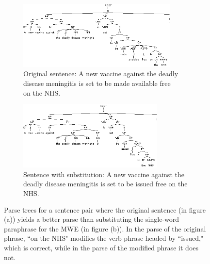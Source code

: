 \documentclass[11pt]{article}
\begin{document}
\begin{figure}
\centering
\begin{subfigure}{.5\textwidth}
  \centering
  \includegraphics[width=80mm]{figs/made_available_tree.png}
  \caption{Original sentence: A new vaccine against the deadly \\
disease meningitis is set to be made available free \\
on the NHS.}
  \label{fig:sub1}
\end{subfigure}%
\begin{subfigure}{.5\textwidth}
  \centering
  \includegraphics[width=73mm]{figs/issued_tree.png}
  \caption{Sentence with substitution: A new vaccine against the deadly disease meningitis is set to be issued free on the NHS.}
  \label{fig:sub2}
\end{subfigure}
\caption{Parse trees for a sentence pair where the original sentence (in figure (a)) yields a better parse than substituting the single-word paraphrase for the MWE (in figure (b)). In the parse of the original phrase, ``on the NHS" modifies the verb phrase headed by ``issued," which is correct, while in the parse of the modified phrase it does not.}
\label{issued}
\end{figure}
\end{document}
